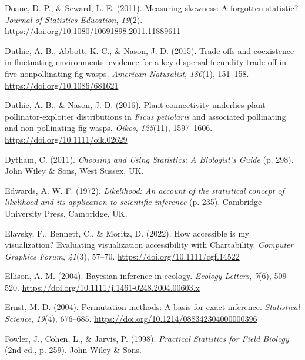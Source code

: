 \documentclass[
  openany]{krantz}
\newlength{\cslhangindent}
\newlength{\cslentryspacingunit} %
\newenvironment{CSLReferences}[2] %
 {%
  \setlength{\parindent}{0pt}
  \ifodd #1
  \let\oldpar\par
  \def\par{\hangindent=\cslhangindent\oldpar}
  \fi
  \setlength{\parskip}{#2\cslentryspacingunit}
 }%
 {}
\begin{document}
\begin{CSLReferences}{1}{0}
\leavevmode{}%
Doane, D. P., \& Seward, L. E. (2011). {Measuring skewness: A forgotten statistic?} \emph{Journal of Statistics Education}, \emph{19}(2). \url{https://doi.org/10.1080/10691898.2011.11889611}

\leavevmode{}%
Duthie, A. B., Abbott, K. C., \& Nason, J. D. (2015). {Trade-offs and coexistence in fluctuating environments: evidence for a key dispersal-fecundity trade-off in five nonpollinating fig wasps}. \emph{American Naturalist}, \emph{186}(1), 151--158. \url{https://doi.org/10.1086/681621}

\leavevmode{}%
Duthie, A. B., \& Nason, J. D. (2016). {Plant connectivity underlies plant-pollinator-exploiter distributions in \emph{Ficus petiolaris} and associated pollinating and non-pollinating fig wasps}. \emph{Oikos}, \emph{125}(11), 1597--1606. \url{https://doi.org/10.1111/oik.02629}

\leavevmode{}%
Dytham, C. (2011). \emph{{Choosing and Using Statistics: A Biologist's Guide}} (p. 298). John Wiley \& Sons, West Sussex, UK.

\leavevmode{}%
Edwards, A. W. F. (1972). \emph{{Likelihood: An account of the statistical concept of likelihood and its application to scientific inference}} (p. 235). Cambridge University Press, Cambridge, UK.

\leavevmode{}%
Elavsky, F., Bennett, C., \& Moritz, D. (2022). {How accessible is my visualization? Evaluating visualization accessibility with Chartability}. \emph{Computer Graphics Forum}, \emph{41}(3), 57--70. \url{https://doi.org/10.1111/cgf.14522}

\leavevmode{}%
Ellison, A. M. (2004). {Bayesian inference in ecology}. \emph{Ecology Letters}, \emph{7}(6), 509--520. \url{https://doi.org/10.1111/j.1461-0248.2004.00603.x}

\leavevmode{}%
Ernst, M. D. (2004). {Permutation methods: A basis for exact inference}. \emph{Statistical Science}, \emph{19}(4), 676--685. \url{https://doi.org/10.1214/088342304000000396}

\leavevmode{}%
Fowler, J., Cohen, L., \& Jarvis, P. (1998). \emph{{Practical Statistics for Field Biology}} (2nd ed., p. 259). John Wiley \& Sons.


\end{CSLReferences}
\end{document}
